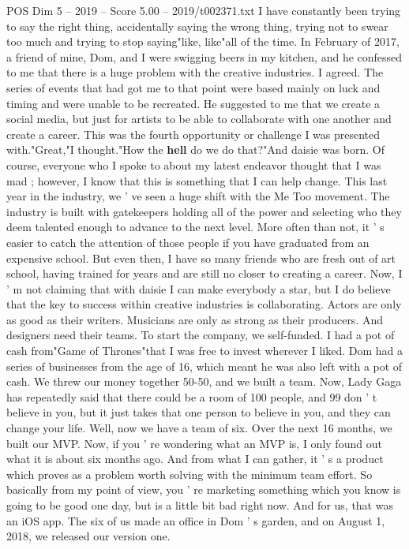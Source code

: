 \begin{textsample}{POS Dim 5 – 2019 – Score 5.00 – 2019/t002371.txt}
I have constantly been trying to say the right thing, accidentally saying the wrong thing, trying not to swear too much and trying to stop saying"like, like"all of the time.
In February of 2017, a friend of mine, Dom, and I were swigging beers in my kitchen, and he confessed to me that there is a huge problem with the creative industries.
I agreed.
The series of events that had got me to that point were based mainly on luck and timing and were unable to be recreated.
He suggested to me that we create a social media, but just for artists to be able to collaborate with one another and create a career.
This was the fourth opportunity or challenge I was presented with."Great,"I thought."How the \textbf{hell} do we do that?"And daisie was born.
Of course, everyone who I spoke to about my latest endeavor thought that I was mad ; however, I know that this is something that I can help change.
This last year in the industry, we ' ve seen a huge shift with the Me Too movement.
The industry is built with gatekeepers holding all of the power and selecting who they deem talented enough to advance to the next level.
More often than not, it ' s easier to catch the attention of those people if you have graduated from an expensive school.
But even then, I have so many friends who are fresh out of art school, having trained for years and are still no closer to creating a career.
Now, I ' m not claiming that with daisie I can make everybody a star, but I do believe that the key to success within creative industries is collaborating.
Actors are only as good as their writers.
Musicians are only as strong as their producers.
And designers need their teams.
To start the company, we self-funded.
I had a pot of cash from"Game of Thrones"that I was free to invest wherever I liked.
Dom had a series of businesses from the age of 16, which meant he was also left with a pot of cash.
We threw our money together 50-50, and we built a team.
Now, Lady Gaga has repeatedly said that there could be a room of 100 people, and 99 don ' t believe in you, but it just takes that one person to believe in you, and they can change your life.
Well, now we have a team of six.
Over the next 16 months, we built our MVP.
Now, if you ' re wondering what an MVP is, I only found out what it is about six months ago.
And from what I can gather, it ' s a product which proves as a problem worth solving with the minimum team effort.
So basically from my point of view, you ' re marketing something which you know is going to be good one day, but is a little bit bad right now.
And for us, that was an iOS app.
The six of us made an office in Dom ' s garden, and on August 1, 2018, we released our version one.

\end{textsample}
